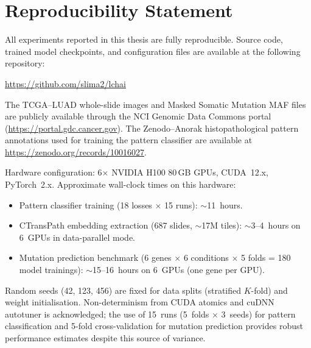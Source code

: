 \chapter{Reproducibility Statement}
\label{app:reproducibility}

All experiments reported in this thesis are fully reproducible.  Source code, trained model checkpoints, and configuration files are available at the following repository:

\begin{center}
\url{https://github.com/slima2/lchai}
\end{center}

The TCGA--LUAD whole-slide images and Masked Somatic Mutation MAF files are publicly available through the NCI Genomic Data Commons portal (\url{https://portal.gdc.cancer.gov}).  The Zenodo--Anorak histopathological pattern annotations used for training the pattern classifier are available at \url{https://zenodo.org/records/10016027}.

Hardware configuration: 6$\times$ NVIDIA H100 80\,GB GPUs, CUDA~12.x,
PyTorch~2.x.
Approximate wall-clock times on this hardware:
\begin{itemize}
    \item Pattern classifier training (18 losses $\times$ 15 runs):
    $\sim$11~hours.
    \item CTransPath embedding extraction (687 slides, $\sim$17M tiles):
    $\sim$3--4~hours on 6~GPUs in data-parallel mode.
    \item Mutation prediction benchmark (6 genes $\times$ 6 conditions
    $\times$ 5 folds = 180 model trainings): $\sim$15--16~hours on
    6~GPUs (one gene per GPU).
\end{itemize}

Random seeds (42, 123, 456) are fixed for data splits (stratified
$K$-fold) and weight initialisation.
Non-determinism from CUDA atomics and cuDNN autotuner is acknowledged;
the use of 15~runs (5~folds $\times$ 3~seeds) for pattern
classification and 5-fold cross-validation for mutation prediction
provides robust performance estimates despite this source of variance.
